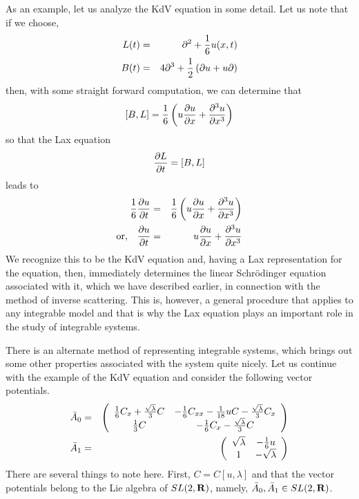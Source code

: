 \documentclass[a4paper,11pt]{article}
\begin{document}
As an example, let us analyze the KdV equation in some detail. Let us
note that if we choose,
\begin{eqnarray}
L (t) & = & \partial^{2} + {1\over 6} u (x,t)\nonumber\\
B (t) & = & 4 \partial^{3} + {1\over 2} \left(\partial u + u
\partial\right)
\end{eqnarray}
then, with some straight forward computation, we can determine that
\begin{equation}
\left[ B , L \right] = {1\over 6} \left(u {\partial u\over \partial x}
+ {\partial^{3} u\over \partial x^{3}}\right)
\end{equation}
so that the Lax equation
$$
{\partial L\over \partial t} = \left[ B , L \right]
$$
leads to
\begin{eqnarray}
{1\over 6} {\partial u\over \partial t} & = & {1\over 6} \left( u
{\partial u\over \partial x} + {\partial^{3} u\over \partial
x^{3}}\right)\nonumber\\
{\rm or,}\quad {\partial u\over \partial t} & = & u {\partial u\over
\partial x} + {\partial^{3} u\over \partial x^{3}}
\end{eqnarray}
We recognize this to be the KdV equation and, having a Lax
representation for the equation, then, immediately determines the
linear Schr\"{o}dinger equation associated with it, which we have
described earlier, in connection with the method of inverse
scattering. This is, however, a general procedure that applies to any
integrable model and that is why the Lax equation plays an important
role in the study of integrable systems.
\vfill\eject


There is an alternate method of representing integrable systems, which
brings out some other properties associated with the system quite
nicely. Let us continue with the example of the KdV equation and
consider the following vector potentials.
\begin{eqnarray}
\bar{A}_{0} & = & \left(\begin{array}{cc}
{1\over 6} C_{x} + {\sqrt{\lambda}\over 3} C & - {1\over 6} C_{xx} -
{1\over 18} u C - {\sqrt{\lambda}\over 3} C_{x}\\
{1\over 3} C & - {1\over 6} C_{x} - {\sqrt{\lambda}\over 3} C
\end{array}\right)\nonumber\\
\bar{A}_{1} & = & \left(\begin{array}{cc}
\sqrt{\lambda} & - {1\over 6} u\\
1 & - \sqrt{\lambda}
\end{array}\right)
\end{eqnarray}
There are several things to note here. First, $C = C[u,\lambda]$ and
that the vector potentials belong to the Lie algebra of $SL(2,{\bf
R})$, namely, $\bar{A}_{0},\bar{A}_{1}\in SL(2,{\bf R})$.
\end{document}
